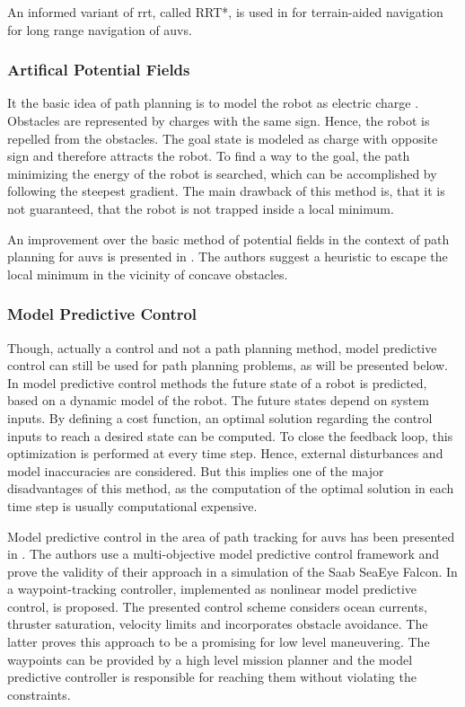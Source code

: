 An informed variant of \ac{rrt}, called RRT*, is used in \cite{Ma18} for terrain-aided navigation for long range navigation of \acp{auv}.

\subsubsection{Artifical Potential Fields}
It the basic idea of path planning is to model the robot as electric charge \cite{Gomez15}. Obstacles are represented by charges with the same sign. Hence, the robot is repelled from the obstacles. The goal state is modeled as charge with opposite sign and therefore attracts the robot. To find a way to the goal, the path minimizing the energy of the robot is searched, which can be accomplished by following the steepest gradient. The main drawback of this method is, that it is not guaranteed, that the robot is not trapped inside a local minimum. 

An improvement over the basic method of potential fields in the context of path planning for \acp{auv} is presented in \cite{Fu-guang05}. The authors suggest a heuristic to escape the local minimum in the vicinity of concave obstacles.

\subsubsection{Model Predictive Control}

Though, actually a control and not a path planning method, model predictive control can still be used for path planning problems, as will be presented below. In model predictive control methods the future state of a robot is predicted, based on a dynamic model of the robot. The future states depend on system inputs. By defining a cost function, an optimal solution regarding the control inputs to reach a desired state can be computed. To close the feedback loop, this optimization is performed at every time step. Hence, external disturbances and model inaccuracies are considered. But this implies one of the major disadvantages of this method, as the computation of the optimal solution in each time step is usually computational expensive.

Model predictive control in the area of path tracking for \acp{auv} has been presented in \cite{Shen16}. The authors use a multi-objective model predictive control framework and prove the validity of their approach in a simulation of the Saab SeaEye Falcon. In \cite{Heshmati18} a waypoint-tracking controller, implemented as nonlinear model predictive control, is proposed. The presented control scheme considers ocean currents, thruster saturation, velocity limits and incorporates obstacle avoidance. The latter proves this approach to be a promising for low level maneuvering. The waypoints can be provided by a high level mission planner and the model predictive controller is responsible for reaching them without violating the constraints.


